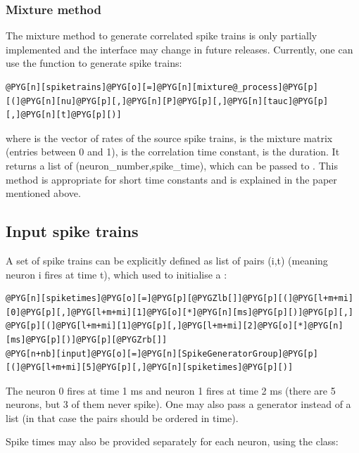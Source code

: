 \documentclass[letterpaper,10pt,english]{manual}
\begin{document}
\subsubsection{Mixture method}

The mixture method to generate correlated spike trains is only partially implemented and the
interface may change in future releases. Currently, one can use the function
 to generate spike trains:

\begin{Verbatim}[commandchars=@\[\]]
@PYG[n][spiketrains]@PYG[o][=]@PYG[n][mixture@_process]@PYG[p][(]@PYG[n][nu]@PYG[p][,]@PYG[n][P]@PYG[p][,]@PYG[n][tauc]@PYG[p][,]@PYG[n][t]@PYG[p][)]
\end{Verbatim}

where  is the vector of rates of the source spike trains,
 is the mixture matrix (entries between 0 and 1),
 is the correlation time constant,
 is the duration. It returns a list of
(neuron\_number,spike\_time), which can be passed to
. This method is appropriate for short time constants and is explained
in the paper mentioned above.


\subsection{Input spike trains}

A set of spike trains can be explicitly defined as list of pairs (i,t)
(meaning neuron i fires at time t), which used to initialise a
\hyperlink{brian.SpikeGeneratorGroup}{}:

\begin{Verbatim}[commandchars=@\[\]]
@PYG[n][spiketimes]@PYG[o][=]@PYG[p][@PYGZlb[]]@PYG[p][(]@PYG[l+m+mi][0]@PYG[p][,]@PYG[l+m+mi][1]@PYG[o][*]@PYG[n][ms]@PYG[p][)]@PYG[p][,] @PYG[p][(]@PYG[l+m+mi][1]@PYG[p][,]@PYG[l+m+mi][2]@PYG[o][*]@PYG[n][ms]@PYG[p][)]@PYG[p][@PYGZrb[]]
@PYG[n+nb][input]@PYG[o][=]@PYG[n][SpikeGeneratorGroup]@PYG[p][(]@PYG[l+m+mi][5]@PYG[p][,]@PYG[n][spiketimes]@PYG[p][)]
\end{Verbatim}

The neuron 0 fires at time 1 ms and neuron 1 fires at time 2 ms (there are 5 neurons,
but 3 of them never spike).
One may also pass a generator instead of a list (in that case the pairs should be
ordered in time).

Spike times may also be provided separately for each neuron, using the
\hyperlink{brian.MultipleSpikeGeneratorGroup}{} class:
\end{document}
